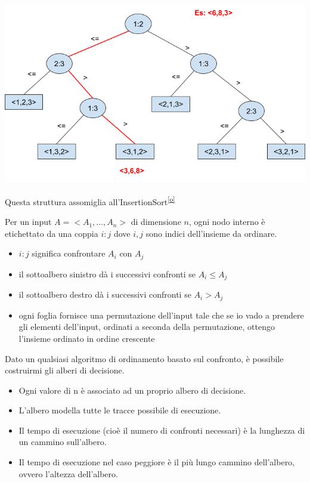 \documentclass[tikz]{article}
\providecommand{\tightlist}{%
  \setlength{\itemsep}{0pt}\setlength{\parskip}{0pt}}
\begin{document}
{\includegraphics{images/image531.png}}

{Questa struttura assomiglia all'InsertionSort}\textsuperscript{\protect\hyperlink{cmnt15}{{[}o{]}}}

{Per un input $A = <A_1,\ldots,A_n>$ di dimensione $n$, ogni nodo interno è etichettato da una coppia $i:j$ dove $i,j$ sono indici dell'insieme da ordinare.}

\begin{itemize}
\tightlist
\item
  {$i:j$ significa confrontare $A_i$ con $A_j$}
\item
  {il sottoalbero sinistro dà i successivi confronti se $A_i \leq A_j$}
\item
  {il sottoalbero destro dà i successivi confronti se $A_i > A_j$}
\item
  {ogni foglia fornisce una permutazione dell'input tale che se io vado a prendere gli elementi dell'input, ordinati a seconda della permutazione, ottengo l'insieme ordinato in ordine crescente}
\end{itemize}

{Dato un qualsiasi algoritmo di ordinamento basato sul confronto, è possibile costruirmi gli alberi di decisione.}

\begin{itemize}
\tightlist
\item
  {Ogni valore di n è associato ad un proprio albero di decisione.}
\item
  {L'albero modella tutte le tracce possibile di esecuzione.}
\item
  {Il tempo di esecuzione (cioè il numero di confronti necessari) è la lunghezza di un cammino sull'albero.}
\item
  {Il tempo di esecuzione nel caso peggiore è il più lungo cammino dell'albero, ovvero l'altezza dell'albero.}
\end{itemize}
\end{document}

